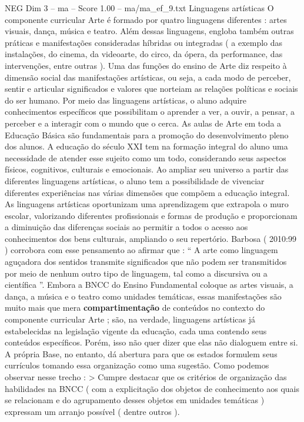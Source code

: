 \begin{textsample}{NEG Dim 3 – ma – Score 1.00 – ma/ma\_ef\_9.txt}  \label{ex:f3_neg_142}
Linguagens artísticas O componente curricular Arte é formado por quatro linguagens diferentes : artes visuais, dança, música e teatro.
Além dessas linguagens, engloba também outras práticas e manifestações consideradas híbridas ou integradas ( a exemplo das instalações, do cinema, da videoarte, do circo, da ópera, da performance, das intervenções, entre outras ).
Uma das funções do ensino de Arte diz respeito à dimensão social das manifestações artísticas, ou seja, a cada modo de perceber, sentir e articular significados e valores que norteiam as relações políticas e sociais do ser humano.
Por meio das linguagens artísticas, o aluno adquire conhecimentos específicos que possibilitam o aprender a ver, a ouvir, a pensar, a perceber e a interagir com o mundo que o cerca.
As aulas de Arte em toda a Educação Básica são fundamentais para a promoção do desenvolvimento pleno dos alunos.
A educação do século XXI tem na formação integral do aluno uma necessidade de atender esse sujeito como um todo, considerando seus aspectos físicos, cognitivos, culturais e emocionais.
Ao ampliar seu universo a partir das diferentes linguagens artísticas, o aluno tem a possibilidade de vivenciar diferentes experiências nas várias dimensões que compõem a educação integral.
As linguagens artísticas oportunizam uma aprendizagem que extrapola o muro escolar, valorizando diferentes profissionais e formas de produção e proporcionam a diminuição das diferenças sociais ao permitir a todos o acesso aos conhecimentos dos bens culturais, ampliando o seu repertório.
Barbosa ( 2010:99 ) corrobora com esse pensamento ao afirmar que : “ A arte como linguagem aguçadora dos sentidos transmite significados que não podem ser transmitidos por meio de nenhum outro tipo de linguagem, tal como a discursiva ou a científica ”.
Embora a BNCC do Ensino Fundamental coloque as artes visuais, a dança, a música e o teatro como unidades temáticas, essas manifestações são muito mais que mera \textbf{compartimentação} de conteúdos no contexto do componente curricular Arte ; são, na verdade, linguagens artísticas já estabelecidas na legislação vigente da educação, cada uma contendo seus conteúdos específicos.
Porém, isso não quer dizer que elas não dialoguem entre si.
A própria Base, no entanto, dá abertura para que os estados formulem seus currículos tomando essa organização como uma sugestão.
Como podemos observar nesse trecho : > Cumpre destacar que os critérios de organização das habilidades na BNCC ( com a explicitação dos objetos de conhecimento aos quais se relacionam e do agrupamento desses objetos em unidades temáticas ) expressam um arranjo possível ( dentre outros ).

\end{textsample}
